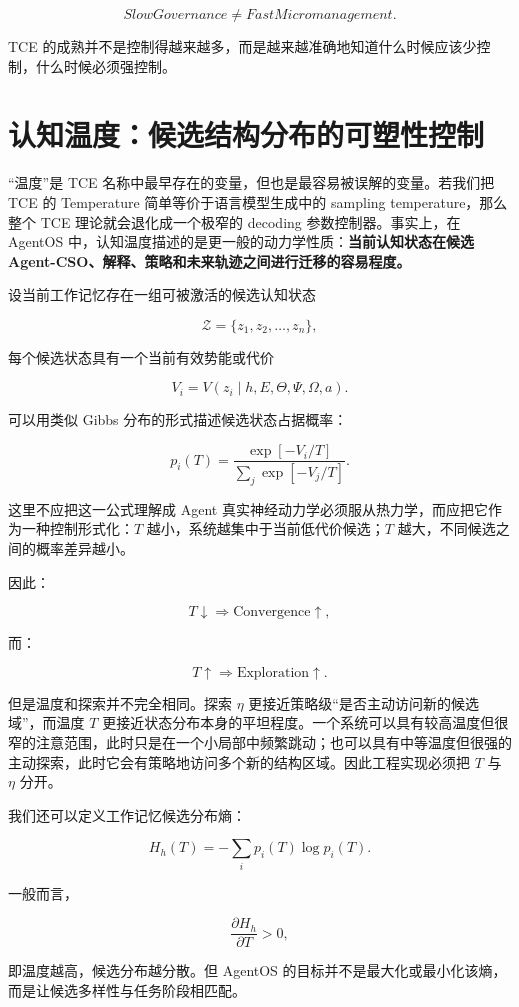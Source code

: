 \[
\boxed{
SlowGovernance\neq FastMicromanagement.
}
\]

TCE 的成熟并不是控制得越来越多，而是越来越准确地知道什么时候应该少控制，什么时候必须强控制。

\section{认知温度：候选结构分布的可塑性控制}

“温度”是 TCE 名称中最早存在的变量，但也是最容易被误解的变量。若我们把 TCE 的 Temperature 简单等价于语言模型生成中的 sampling temperature，那么整个 TCE 理论就会退化成一个极窄的 decoding 参数控制器。事实上，在 AgentOS 中，认知温度描述的是更一般的动力学性质：\textbf{当前认知状态在候选 Agent-CSO、解释、策略和未来轨迹之间进行迁移的容易程度。}

设当前工作记忆存在一组可被激活的候选认知状态

\[
\mathcal Z
=
\{z_1,z_2,\ldots,z_n\},
\]

每个候选状态具有一个当前有效势能或代价

\[
V_i
=
V(z_i\mid h,E,\Theta,\Psi,\Omega,a).
\]

可以用类似 Gibbs 分布的形式描述候选状态占据概率：

\[
p_i(T)
=
\frac{
\exp\left[-V_i/T\right]
}{
\sum_j
\exp\left[-V_j/T\right]
}.
\]

这里不应把这一公式理解成 Agent 真实神经动力学必须服从热力学，而应把它作为一种控制形式化：$T$ 越小，系统越集中于当前低代价候选；$T$ 越大，不同候选之间的概率差异越小。

因此：

\[
T\downarrow
\Rightarrow
\text{Convergence}\uparrow,
\]

而：

\[
T\uparrow
\Rightarrow
\text{Exploration}\uparrow.
\]

但是温度和探索并不完全相同。探索 $\eta$ 更接近策略级“是否主动访问新的候选域”，而温度 $T$ 更接近状态分布本身的平坦程度。一个系统可以具有较高温度但很窄的注意范围，此时只是在一个小局部中频繁跳动；也可以具有中等温度但很强的主动探索，此时它会有策略地访问多个新的结构区域。因此工程实现必须把 $T$ 与 $\eta$ 分开。

我们还可以定义工作记忆候选分布熵：

\[
H_h(T)
=
-
\sum_i p_i(T)\log p_i(T).
\]

一般而言，

\[
\frac{\partial H_h}{\partial T}>0,
\]

即温度越高，候选分布越分散。但 AgentOS 的目标并不是最大化或最小化该熵，而是让候选多样性与任务阶段相匹配。

